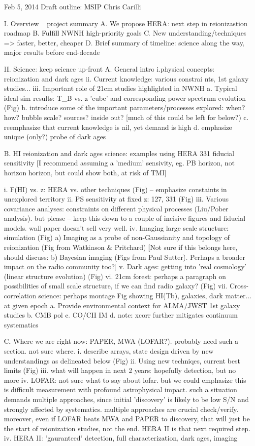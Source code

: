 Feb 5, 2014
Draft outline: MSIP
Chris Carilli

I. Overview ~ project summary 
A. We propose HERA: next step in reionizastion roadmap
B. Fulfill NWNH high-priority goals
C. New understanding/techniques => faster, better, cheaper
D. Brief summary of timeline: science along the way, major results before end-decade


II. Science: keep science up-front
A. General intro 
i.physical concepts: reionization and dark ages
ii. Current knowledge: various constrai	nts, 1st galaxy studies...
iii. Important role of 21cm studies highlighted in NWNH
a. Typical ideal sim results: T_B vs. z 'cube' and corresponding power spectrum evolution (Fig)
b. introduce some of the important parameters/processes explored: when? how?
bubble scale? sources? inside out? [much of this could be left for below?)
c. reemphasize that current knowledge is nil, yet demand is high
d. emphasize unique (only?) probe of dark ages

B. HI reionization and dark ages science: examples using HERA 331 fiducial sensitivity
[I recommend assuming a 'medium' sensivity, eg. PB horizon, not horizon horizon, but could show both,
at risk of TMI]

i. F(HI) vs. z: HERA vs. other techniques (Fig) -- emphasize constaints in unexplored territory
ii. PS sensitivity at fixed z: 127, 331 (Fig)
iii. Various covariance analyses: constraints on different physical processes (Liu/Pober analysis). but
please -- keep this down to a couple of incisive figures and fiducial models. wall paper doesn't sell very well. 
iv. Imaging large scale structure: simulation (Fig) 
    a) Imaging as a probe of non-Gaussianity and topology of reionization (Fig from Watkinson & Pritchard)
    [Not sure if this belongs here, should discuss: b) Bayesian imaging (Figs from Paul Sutter).  Perhaps a broader impact on the radio community too?]
v. Dark ages: getting into 'real cosmology' (linear structure evolution)  (Fig)
vi. 21cm forest: perhaps a paragraph on possibilities of small scale structure, if we can find radio galaxy? (Fig) 
vii. Cross-correlation science: perhaps montage Fig showing HI(Tb), galaxies, dark matter... at given epoch
a. Provide environmental context for ALMA/JWST 1st galaxy studies
b. CMB pol
c. CO/CII IM
d. note: xcorr further mitigates continuum systematics

C. Where we are right now: PAPER, MWA (LOFAR?). probably need such a section. not sure where.
i. describe arrays, state design driven by new understandings as delineated below (Fig)
ii. Using new techniqes, current best limits  (Fig)
iii. what will happen in next 2 years: hopefully detection, but no more
iv. LOFAR: not sure what to say about lofar. but we could emphasize this is difficult measurement with 
profound astrophysical impact. such a situation demands multiple approaches, since initial 'discovery' is 
likely to be low S/N and strongly affected by systematics. multiple approaches are crucial check/verify. 
moreover, even if LOFAR beats MWA and PAPER to discovery, that will just be the start of reionization 
studies, not the end. HERA II is that next required step. 
iv. HERA II: 'gauranteed' detection, full characterization, dark ages, imaging


